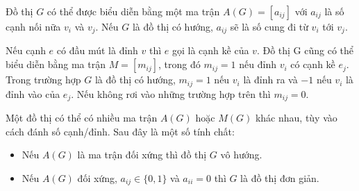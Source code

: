 Đồ thị $G$ có thể được biểu diễn bằng một ma trận $A(G) = [a_{ij}]$ với $a_{ij}$ là số cạnh nối nữa $v_i$ và $v_j$. Nếu $G$ là đồ thị có hướng, $a_{ij}$ sẽ là số cung đi từ $v_i$ tới $v_j$.

Nếu cạnh $e$ có đầu mút là đỉnh $v$ thì $e$ gọi là cạnh kề của $v$. Đồ thị G cũng có thể biểu diễn bằng ma trận $M = [m_{ij}]$, trong đó $m_{ij} = 1$ nếu đỉnh $v_i$ có cạnh kề $e_j$. Trong trường hợp $G$ là đồ thị có hướng, $m_{ij} = 1$ nếu $v_i$ là đỉnh ra  và $-1$ nếu $v_i$ là đỉnh vào của $e_j$. Nếu không rơi vào những trường hợp trên thì $m_{ij} = 0$.




Một đồ thị có thể có nhiều ma trận $A(G)$ hoặc $M(G)$ khác nhau, tùy vào cách đánh số cạnh/đỉnh. Sau đây là một số tính chất:
\begin{itemize}
	\item Nếu $A(G)$ là ma trận đối xứng thì đồ thị $G$ vô hướng. 
	\item Nếu $A(G)$ đối xứng, $a_{ij} \in \{0,1\}$ và $a_{ii} = 0$ thì $G$ là đồ thị đơn giản.
\end{itemize}

